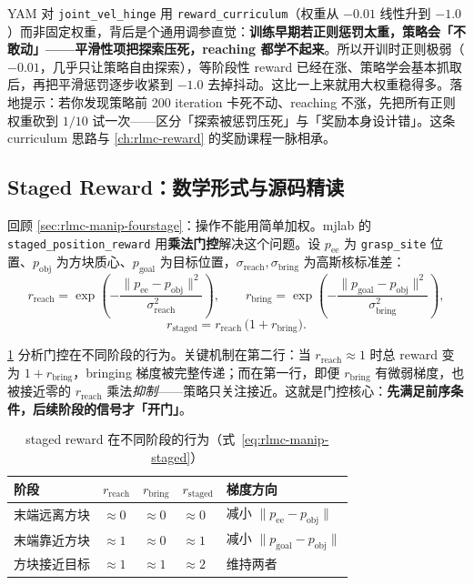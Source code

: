 \begin{insight}\label{ins:rlmc-manip-rewcurr}
YAM 对 \verb|joint_vel_hinge| 用 \verb|reward_curriculum|（权重从 $-0.01$ 线性升到 $-1.0$）而非固定权重，背后是个通用调参直觉：\textbf{训练早期若正则惩罚太重，策略会「不敢动」——平滑性项把探索压死，reaching 都学不起来}。所以开训时正则极弱（$-0.01$，几乎只让策略自由探索），等阶段性 reward 已经在涨、策略学会基本抓取后，再把平滑惩罚逐步收紧到 $-1.0$ 去掉抖动。这比一上来就用大权重稳得多。落地提示：若你发现策略前 200 iteration 卡死不动、reaching 不涨，先把所有正则权重砍到 $1/10$ 试一次——区分「探索被惩罚压死」与「奖励本身设计错」。这条 curriculum 思路与 \cref{ch:rlmc-reward} 的奖励课程一脉相承。
\end{insight}

\subsection{Staged Reward：数学形式与源码精读}
\label{sec:rlmc-manip-staged}

回顾 \cref{sec:rlmc-manip-fourstage}：操作不能用简单加权。mjlab 的 \verb|staged_position_reward| 用\textbf{乘法门控}解决这个问题。设 $p_{\text{ee}}$ 为 \verb|grasp_site| 位置、$p_{\text{obj}}$ 为方块质心、$p_{\text{goal}}$ 为目标位置，$\sigma_{\text{reach}},\sigma_{\text{bring}}$ 为高斯核标准差：
\begin{equation}
r_{\text{reach}} = \exp\!\left(-\frac{\|p_{\text{ee}}-p_{\text{obj}}\|^2}{\sigma_{\text{reach}}^2}\right),\qquad
r_{\text{bring}} = \exp\!\left(-\frac{\|p_{\text{goal}}-p_{\text{obj}}\|^2}{\sigma_{\text{bring}}^2}\right),
\label{eq:rlmc-manip-reachbring}
\end{equation}
\begin{equation}
r_{\text{staged}} = r_{\text{reach}}\,\bigl(1+r_{\text{bring}}\bigr).
\label{eq:rlmc-manip-staged}
\end{equation}

\cref{tab:rlmc-manip-stagereward} 分析门控在不同阶段的行为。关键机制在第二行：当 $r_{\text{reach}}\approx 1$ 时总 reward 变为 $1+r_{\text{bring}}$，bringing 梯度被完整传递；而在第一行，即便 $r_{\text{bring}}$ 有微弱梯度，也被接近零的 $r_{\text{reach}}$ 乘法\emph{抑制}——策略只关注接近。这就是门控核心：\textbf{先满足前序条件，后续阶段的信号才「开门」}。

\begin{table}[ht]
\centering
\small
\caption{staged reward 在不同阶段的行为（式~\eqref{eq:rlmc-manip-staged}）}
\label{tab:rlmc-manip-stagereward}
\begin{tabular}{@{}lllll@{}}
\toprule
阶段 & $r_{\text{reach}}$ & $r_{\text{bring}}$ & $r_{\text{staged}}$ & 梯度方向 \\
\midrule
末端远离方块 & $\approx 0$ & $\approx 0$ & $\approx 0$ & 减小 $\|p_{\text{ee}}-p_{\text{obj}}\|$ \\
末端靠近方块 & $\approx 1$ & $\approx 0$ & $\approx 1$ & 减小 $\|p_{\text{goal}}-p_{\text{obj}}\|$ \\
方块接近目标 & $\approx 1$ & $\approx 1$ & $\approx 2$ & 维持两者 \\
\bottomrule
\end{tabular}
\end{table}

